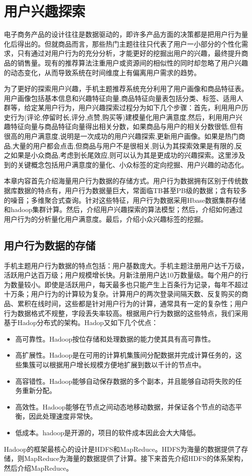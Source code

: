 
\chapter{用户兴趣探索}
\label{chap:interestExplore}
电子商务产品的设计往往是数据驱动的，即许多产品方面的决策都是把用户行为量化后得出的。但就商品而言，那些热门主题往往只代表了用户一小部分的个性化需求，只有通过对用户行为的充分分析，才能更好的挖掘出用户的兴趣，最终提升商品的销售量。现有的推荐算法注重用户或资源间的相似性的同时却忽略了用户兴趣的动态变化，从而导致系统在时间维度上有偏离用户需求的趋势。

为了更好的探索用户兴趣，手机主题推荐系统充分利用了用户画像和商品特征表。用户画像包括基本信息和兴趣特征向量,商品特征向量表包括分类、标签、适用人群等，给定某用户行为，用户兴趣探索过程分为如下几个步骤：首先，利用用户历史行为(评论,停留时长,评分,点赞,购买等)建模量化用户满意度,然后，利用用户兴趣特征向量与商品特征向量得出相关分数，如果商品与用户的相关分数很低,但有很高的用户满意度,说明是一次成功的用户兴趣探索,更新用户画像。如果是热门商品,大量的用户都会点击,但商品与用户不是很相关,则认为其探索效果是有限的,反之如果是小众商品,考虑到长尾效应,则可以认为其是更成功的兴趣探索。这里涉及到的关键概念包括用户满意度的量化、小众标签的定向挖掘、用户兴趣的动态化。

本章内容首先介绍海量用户行为数据的存储方式。用户行为数据拥有区别于传统数据库数据的特点有，用户行为数据量巨大，常面临TB甚至PB级的数据；含有较多的噪音；多维聚合式查询。针对这些特征，用户行为数据采用Hbase数据集群存储和hadoop集群计算。然后，介绍用户兴趣探索的算法模型；然后，介绍如何通过用户行为的分析量化用户满意度。最后，介绍小众兴趣标签的挖掘。

\section{用户行为数据的存储}
手机主题用户行为数据的特点包括：用户基数庞大。手机主题注册用户达千万级，活跃用户达百万级；用户规模增长快。月新注册用户达10万数量级。每个用户的行为数量较小。即使是活跃用户，每天最多也只能产生上百条行为记录，每年不超过十万条；用户行为的计算较为复杂。计算用户的两次登录间隔天数、反复购买的商品、累积在线时间，这些都是针对用户行为的计算，通常具有一定的复杂性；用户行为数据格式不规整，字段丢失率较高。根据用户行为数据的这些特点，我们采用基于Hadop分布式的架构。Hadop又如下几个优点：
\begin{itemize}
\item 高可靠性。Hadoop按位存储和处理数据的能力使其具有高可靠性。
\item 高扩展性。Hadoop是在可用的计算机集簇间分配数据并完成计算任务的，这些集簇可以根据用户增长规模方便地扩展到数以千计的节点中。
\item 高容错性。Hadoop能够自动保存数据的多个副本，并且能够自动将失败的任务重新分配。
\item 高效性。Hadoop能够在节点之间动态地移动数据，并保证各个节点的动态平衡，因此处理速度非常快。
\item 低成本。hadoop是开源的，项目的软件成本因此会大大降低。
\end{itemize}
Hadoop的框架最核心的设计是HDFS和MapReduce。HDFS为海量的数据提供了存储，则MapReduce为海量的数据提供了计算。接下来首先介绍HDFS的体系架构，然后介绍MapReduce。
